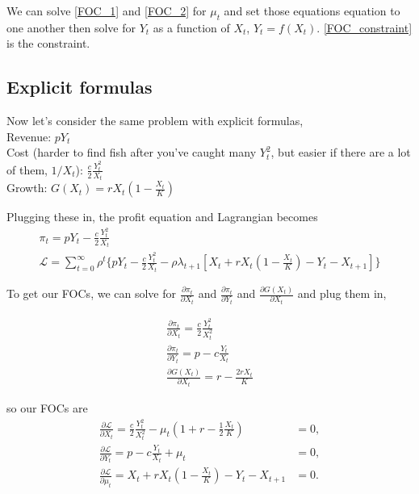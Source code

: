 \documentclass[12pt]{article}
\begin{document}
We can solve \ref{FOC_1} and \ref{FOC_2} for $\mu_t$ and set those equations equation to one another then solve for $Y_t$ as a function of $X_t$, $Y_t = f(X_t)$. \ref{FOC_constraint} is the constraint. \\

\subsection{Explicit formulas}
Now let's consider the same problem with explicit formulas,\\
Revenue: $p Y_t$\\
Cost (harder to find fish after you've caught many $Y_t^2$, but easier if there are a lot of them, $1/X_t$): $\frac{c}{2} \frac{Y_t^2}{X_t}$\\
Growth: $G(X_t) = rX_t (1 - \frac{X_t}{K})$

Plugging these in, the profit equation and Lagrangian becomes 
\begin{align}
    \pi_t = p Y_t - \frac{c}{2} \frac{Y_t^2}{X_t}\\
    \mathcal{L} =  \sum_{t=0}^\infty \rho^t \Big\{ p Y_t - \frac{c}{2} \frac{Y_t^2}{X_t} - \rho \lambda_{t+1} [X_t +rX_t (1 - \frac{X_t}{K}) - Y_t - X_{t+1}] \Big\}
\end{align}

To get our FOCs, we can solve for $\frac{\partial \pi_t}{\partial X_t}$ and $\frac{\partial \pi_t}{\partial Y_t}$ and $\frac{\partial G(X_t)}{\partial X_t}$ and plug them in, 

\begin{align}
    \frac{\partial \pi_t}{\partial X_t} = \frac{c}{2} \frac{Y_t^2}{X_t^2}\\
    \frac{\partial \pi_t}{\partial Y_t} = p - c \frac{Y_t}{X_t}\\
    \frac{\partial G(X_t)}{\partial X_t} = r - \frac{2rX_t}{K}
\end{align}

so our FOCs are 
\begin{align}
    \frac{\partial \mathcal{L}}{\partial X_t} = \frac{c}{2} \frac{Y_t^2}{X_t^2} - \mu_t(1 + r - \frac{1}{2}\frac{X_t}{K})  &= 0,  \label{FOC_1_i}\\
    \frac{\partial \mathcal{L}}{\partial Y_t} = p - c \frac{Y_t}{X_t} + \mu_t  &= 0, \label{FOC_2_i} \\
    \frac{\partial \mathcal{L}}{\partial \mu_t} = X_t +rX_t (1 - \frac{X_t}{K}) - Y_t - X_{t+1} &= 0 \label{FOC_constraint_i}.
\end{align}
\end{document}
